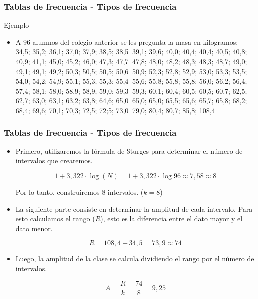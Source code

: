 \documentclass[10pt]{beamer}
\theoremstyle{plain} %
\theoremstyle{definition}
\theoremstyle{remark}
\begin{document}
\begin{frame}
\frametitle{Tablas de frecuencia - Tipos de frecuencia}
\begin{exampleblock}{Ejemplo}
\begin{itemize}[<+->]

\item A 96 alumnos del colegio anterior se les pregunta la masa en kilogramos:\\
\vspace{0.5cm}
34,5; 35,2; 36,1; 37,0; 37,9; 38,5; 38,5; 39,1; 39,6; 40,0; 40,4; 40,4; 40,5; 40,8; 40,9; 41,1; 45,0; 45,2; 46,0; 47,3; 47,7; 47,8; 48,0; 48,2; 48,3; 48,3; 48,7; 49,0; 49,1; 49,1; 49,2; 50,3; 50,5; 50,5; 50,6; 50,9; 52,3; 52,8; 52,9; 53,0; 53,3; 53,5; 54,0; 54,2; 54,9; 55,1; 55,3; 55,3; 55,4; 55,6; 55,8; 55,8; 55,8; 56,0; 56,2; 56,4; 57,4; 58,1; 58,0; 58,9; 58,9; 59,0; 59,3; 59,3; 60,1; 60,4; 60,5; 60,5; 60,7; 62,5; 62,7; 63,0; 63,1; 63,2; 63,8; 64,6; 65,0; 65,0; 65,0; 65,5; 65,6; 65,7; 65,8; 68,2; 68,4; 69,6; 70,1; 70,3; 72,5; 72;5; 73,0; 79,0; 80,4; 80,7; 85,8; 108,4 

\end{itemize} 
\end{exampleblock}
\end{frame}

\begin{frame}
\frametitle{Tablas de frecuencia - Tipos de frecuencia}
\begin{exampleblock}{}
\begin{itemize}[<+->]
\item Primero, utilizaremos la fórmula de Sturges para determinar el número de intervalos que crearemos. 

$$1+3{,}322\cdot \log (N)=1+3{,}322\cdot \log 96\approx 7{,}58\approx 8$$

Por lo tanto, construiremos 8 intervalos. ($k=8$)\\

\item La siguiente parte consiste en determinar la amplitud de cada intervalo. Para esto calculamos el rango ($R$), esto es la diferencia entre el dato mayor y el dato menor. 

$$R=108{,}4-34{,}5=73{,}9\approx 74$$

\item Luego, la amplitud de la clase se calcula dividiendo el rango por el número de intervalos.

$$A=\frac{R}{k}= \frac{74}{8}=9{,}25$$

\end{itemize}
\end{exampleblock}
\end{frame}
\end{document}
